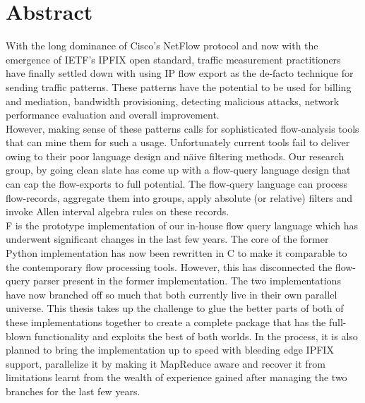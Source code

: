 \begingroup
\let\clearpage\relax
\let\cleardoublepage\relax
\let\cleardoublepage\relax

\chapter*{Abstract}

With the long dominance of Cisco's NetFlow \cite{rfc3954} protocol and now with the emergence of \ac{IETF}'s \ac{IPFIX} \cite{rfc5101} open standard, traffic measurement practitioners have finally settled down with using \ac{IP} flow export as the de-facto technique for sending traffic patterns. These patterns have the potential to be used for billing and mediation, bandwidth provisioning, detecting malicious attacks, network performance evaluation and overall improvement. \\

However, making sense of these patterns calls for sophisticated flow-analysis tools that can mine them for such a usage. Unfortunately current tools fail to deliver owing to their poor language design and n\"aive filtering methods. Our research group, by going clean slate has come up with a flow-query language design \cite{vmarinov:thesis:2009} that can cap the flow-exports to full potential. The flow-query language can process flow-records, aggregate them into groups, apply absolute (or relative) filters and invoke Allen interval algebra rules \cite{fallen:1983} on these records. \\

F \cite{jschauer:2012} is the prototype implementation of our in-house flow query language which has underwent significant changes in the last few years. The core of the former Python implementation \cite{kkanev:thesis:2009} has now been rewritten in C \cite{jschauer:thesis:2011} to make it comparable to the contemporary flow processing tools. However, this has disconnected the flow-query parser present in the former implementation. The two implementations have now branched off so much that both currently live in their own parallel universe. This thesis takes up the challenge to glue the better parts of both of these implementations together to create a complete package that has the full-blown functionality and exploits the best of both worlds. In the process, it is also planned to bring the implementation up to speed with bleeding edge \ac{IPFIX} support, parallelize it by making it MapReduce \cite{jdean:2004} aware and recover it from limitations learnt from the wealth of experience gained after managing the two branches for the last few years. 



\endgroup			
\vfill